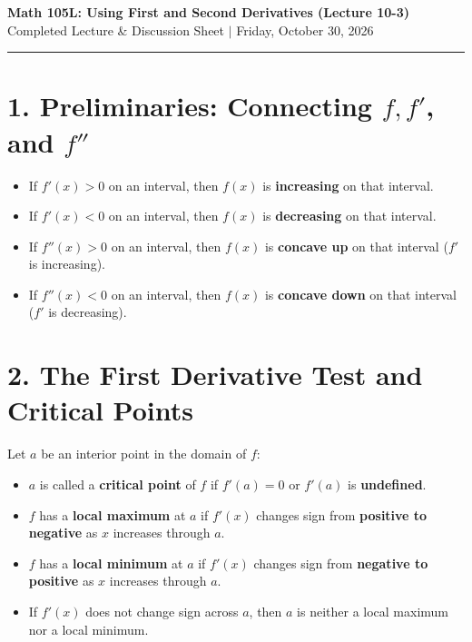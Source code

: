\documentclass[10.5pt]{article}
\begin{document}
\begin{center}
{\Large \textbf{Math 105L: Using First and Second Derivatives (Lecture 10-3)}}\\[2pt]
{\large Completed Lecture & Discussion Sheet \quad $\vert$ \quad Friday, October 30, 2026}
\end{center}
\vspace{2pt}
\hrule
\vspace{8pt}

\section*{1. Preliminaries: Connecting $f, f'$, and $f''$}
\begin{itemize}[leftmargin=1.5em]
  \item If $f'(x) > 0$ on an interval, then $f(x)$ is \textbf{\textcolor{chalkblue}{increasing}} on that interval.
  \item If $f'(x) < 0$ on an interval, then $f(x)$ is \textbf{\textcolor{chalkblue}{decreasing}} on that interval.
  \item If $f''(x) > 0$ on an interval, then $f(x)$ is \textbf{\textcolor{chalkblue}{concave up}} on that interval ($f'$ is increasing).
  \item If $f''(x) < 0$ on an interval, then $f(x)$ is \textbf{\textcolor{chalkblue}{concave down}} on that interval ($f'$ is decreasing).
\end{itemize}

\section*{2. The First Derivative Test and Critical Points}
Let $a$ be an interior point in the domain of $f$:
\begin{itemize}[leftmargin=1.5em]
  \item $a$ is called a \textbf{critical point} of $f$ if $f'(a) = 0$ or $f'(a)$ is \textbf{undefined}.
  \item $f$ has a \textbf{local maximum} at $a$ if $f'(x)$ changes sign from \textbf{positive to negative} as $x$ increases through $a$.
  \item $f$ has a \textbf{local minimum} at $a$ if $f'(x)$ changes sign from \textbf{negative to positive} as $x$ increases through $a$.
  \item If $f'(x)$ does not change sign across $a$, then $a$ is neither a local maximum nor a local minimum.
\end{itemize}
\end{document}
